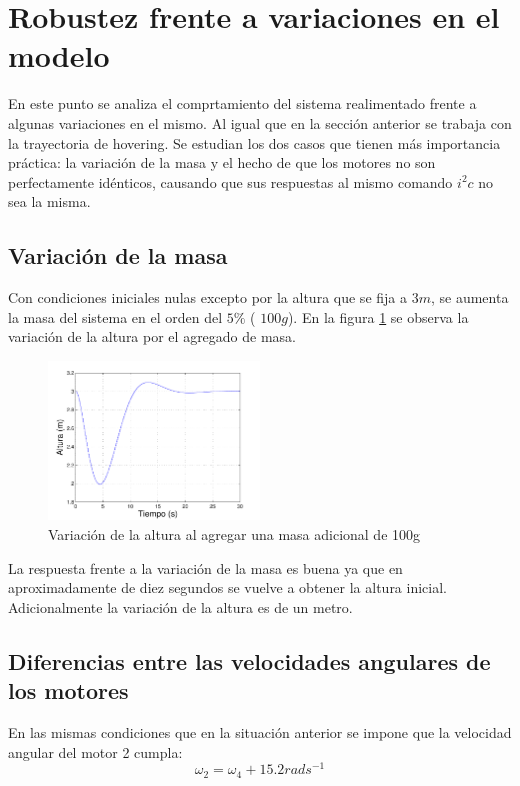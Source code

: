 \documentclass[main]{subfiles}
\begin{document}
\section{Robustez frente a variaciones en el modelo}
\label{sec:robustez}

En este punto se analiza el comprtamiento del sistema realimentado frente a algunas variaciones en el mismo. Al igual que en la secci\'on anterior se trabaja con la trayectoria de hovering. Se estudian los dos casos que tienen m\'as importancia pr\'actica: la variaci\'on de la masa y el hecho de que los motores no son perfectamente id\'enticos, causando que sus respuestas al mismo comando $i^2c$ no sea la misma.
\subsection*{Variaci\'on de la masa}
Con condiciones iniciales nulas excepto por la altura que se fija a $3m$, se aumenta la masa del sistema en el orden del $5\%$ ( $100 g$). En la figura \ref{fig:masa} se observa la variaci\'on de la altura por el agregado de masa.


\begin{figure}[h!]
  \centering
	\includegraphics[width=0.5\textwidth]{./pics_sim_control/robustez/masa.pdf}
  \caption{Variaci\'on de la altura al agregar una masa adicional de 100g}
  \label{fig:masa}
\end{figure}

La respuesta frente a la variaci\'on de la masa es buena ya que en aproximadamente de diez segundos se vuelve a obtener la altura inicial. Adicionalmente la variaci\'on de la altura es de un metro. 

\subsection*{Diferencias entre las velocidades angulares de los motores}

En las mismas condiciones que en la situaci\'on anterior se impone que la velocidad angular del motor 2 cumpla: 
\begin{equation}
\omega_2 = \omega_4 + 15.2rad s^{-1}
\end{equation}
\end{document}
